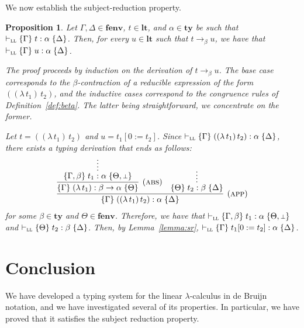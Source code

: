 \documentclass[submission,creativecommons]{eptcs}
\newtheorem{proposition}{Proposition}
\newcommand{\mybox}{\raisebox{3.5pt}{\framebox[7pt]{\rule{0mm}{0.3pt}}}}
\def\qed{\ifmmode\mybox\else{\unskip\nobreak\hfil
\penalty50\hskip1em\null\nobreak\hfil\mybox
\parfillskip=0pt\finalhyphendemerits=0\endgraf}\fi}
\newenvironment{proof}{%

\vspace{.7ex}
\noindent{\it Proof.} \rm}{\qed}
\newcommand{\bt}{{\scriptstyle\bot}}
\newcommand{\iabs}[1]{(\lambda\,#1)}
\newcommand{\iapp}[2]{(#1\,#2)}
\newcommand{\sbstt}[3]{#1[#2 := #3]}
\newcommand{\tytm}[4]{\{#1\}\;#2:#3\;\{#4\}}
\newcommand{\der}[1]{\vdash_{#1}}
\newcommand{\Sll}{{\textsc{ll}}}
\newcommand{\ltm}{\mathord{\mathbf{lt}}}
\newcommand{\ty}{\mathord{\mathbf{ty}}}
\newcommand{\fenv}{\mathord{\mathbf{fenv}}}
\begin{document}
We now establish the subject-reduction property.

\begin{proposition}
Let $\Gamma, \Delta \in \fenv$, $t\in\ltm$, and $\alpha \in \ty$ be such that $\der{\Sll}\tytm{\Gamma}{t}{\alpha}{\Delta}$.
Then, for every $u\in\ltm$ such that $t \rightarrow_{\beta} u$, we have that $\der{\Sll}\tytm{\Gamma}{u}{\alpha}{\Delta}$.
\begin{proof}
The proof proceeds by induction on the derivation of $t \rightarrow_{\beta} u$.
The base case corresponds to the $\beta$-contraction of a reducible expression of the form $\iapp{\iabs{t_1}}{t_2}$,
and the inductive cases correspond to the congruence rules of Definition~\ref{def:beta}.
The latter being straightforward, we concentrate on the former. 

Let $t = \iapp{\iabs{t_1}}{t_2}$ and $u = \sbstt{t_1}{0}{t_2}$.
Since $\der{\Sll}\tytm{\Gamma}{\iapp{\iabs{t_1}}{t_2}}{\alpha}{\Delta}$, there exists a typing derivation that ends as follows:
\begin{align}
\infer[\mbox{(\textsc{app})}]{
\tytm{\Gamma}{\iapp{\iabs{t_1}}{t_2}}{\alpha}{\Delta}
}{
\infer[\mbox{(\textsc{abs})}]{
\tytm{\Gamma}{\iabs{t_1}}{\beta \rightarrow \alpha}{\Theta}
}{
\infer*{\tytm{\Gamma, \beta}{t_1}{\alpha}{\Theta, \bt}}{}
}
&
\infer*{\tytm{\Theta}{t_2}{\beta}{\Delta}}{}
}
\end{align}
for some $\beta\in\ty$ and $\Theta \in \fenv$.
Therefore, we have that $\der{\Sll}\tytm{\Gamma, \beta}{t_1}{\alpha}{\Theta, \bt}$
and $\der{\Sll}\tytm{\Theta}{t_2}{\beta}{\Delta}$.
Then, by Lemma~\ref{lemma:sr},
$\der{\Sll}\tytm{\Gamma}{\sbstt{t_1}{0}{t_2}}{\alpha}{\Delta}$. 
\end{proof}
\end{proposition}

\section{Conclusion}

We have developed a typing system for the linear $\lambda$-calculus in de Bruijn notation, and we have investigated several
of its properties. In particular, we have proved that it satisfies the subject reduction property.
\end{document}
